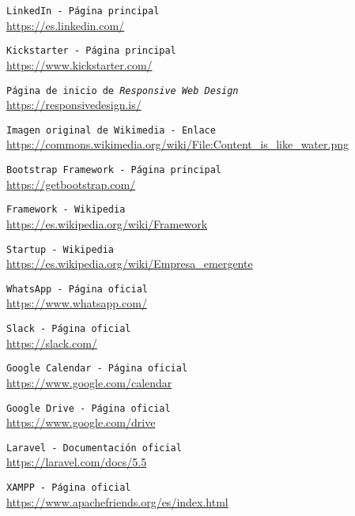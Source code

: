  {\tt LinkedIn - Página principal}\\
\url{https://es.linkedin.com/}

 {\tt Kickstarter - Página principal}\\
\url{https://www.kickstarter.com/}

 {\tt Página de inicio de \textit{Responsive Web Design}}\\
\url{https://responsivedesign.is/}

 {\tt Imagen original de Wikimedia - Enlace}\\
\url{https://commons.wikimedia.org/wiki/File:Content_is_like_water.png}

 {\tt Bootstrap Framework - Página principal}\\
\url{https://getbootstrap.com/}

 {\tt Framework - Wikipedia}\\
\url{https://es.wikipedia.org/wiki/Framework}

 {\tt Startup - Wikipedia}\\
\url{https://es.wikipedia.org/wiki/Empresa_emergente}

 {\tt WhatsApp - Página oficial}\\
\url{https://www.whatsapp.com/}

 {\tt Slack - Página oficial}\\
\url{https://slack.com/}

 {\tt Google Calendar - Página oficial}\\
\url{https://www.google.com/calendar}

 {\tt Google Drive - Página oficial}\\
\url{https://www.google.com/drive}

 {\tt Laravel - Documentación oficial}\\
\url{https://laravel.com/docs/5.5}

 {\tt XAMPP - Página oficial}\\
\url{https://www.apachefriends.org/es/index.html}





















